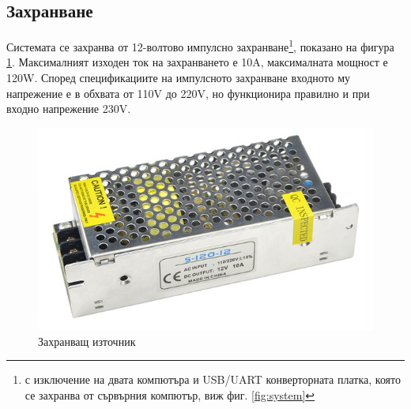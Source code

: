 \subsection{Захранване}
Системата се захранва от 12-волтово импулсно захранване\footnote{с изключение на двата компютъра и USB/UART конверторната платка, която се захранва от сървърния компютър, виж фиг. \ref{fig:system}}, показано на фигура \ref{fig:psu}. Максималният изходен ток на захранването е 10A, максималната мощност е 120W. Според спецификациите на импулсното захранване входното му напрежение е в обхвата от 110V до 220V, но функционира правилно и при входно напрежение 230V.
\begin{figure}[!htb]
    \centering
    \includegraphics[width=0.8\linewidth]{pictures/PSU.jpg}
    \caption{Захранващ източник}
    \label{fig:psu}
\end{figure}